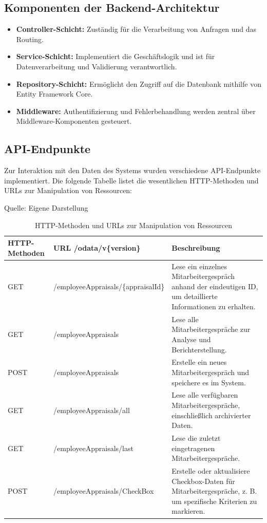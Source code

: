 \subsection{Komponenten der Backend-Architektur}
\begin{itemize}
    \item \textbf{Controller-Schicht:} Zuständig für die Verarbeitung von Anfragen und das Routing.
    \item \textbf{Service-Schicht:} Implementiert die Geschäftslogik und ist für Datenverarbeitung und Validierung verantwortlich.
    \item \textbf{Repository-Schicht:} Ermöglicht den Zugriff auf die Datenbank mithilfe von Entity Framework Core.
    \item \textbf{Middleware:} Authentifizierung und Fehlerbehandlung werden zentral über Middleware-Komponenten gesteuert.
\end{itemize}

\subsection{API-Endpunkte}
Zur Interaktion mit den Daten des Systems wurden verschiedene API-Endpunkte implementiert. Die folgende Tabelle listet die wesentlichen HTTP-Methoden und URLs zur Manipulation von Ressourcen:

\begin{table}[H]
\caption{HTTP-Methoden und URLs zur Manipulation von Ressourcen}
\label{table:http-methods}
\raggedright
{\scriptsize Quelle: Eigene Darstellung} \\[0.3em]
\renewcommand{\arraystretch}{1.1} %
\setlength{\tabcolsep}{1.8pt} %
\begin{tabularx}{\textwidth}{>{\centering\arraybackslash}m{2cm}|>{\centering\arraybackslash}m{5.5cm}|>{\raggedright\arraybackslash}m{6.5cm}}
\hline
\textbf{HTTP-Methoden} & \textbf{URL /odata/v\{version\}} & \textbf{Beschreibung} \\ \hline
GET & /employeeAppraisals/\{appraisalId\} & Lese ein einzelnes Mitarbeitergespräch anhand der eindeutigen ID, um detaillierte Informationen zu erhalten. \\ \hline
GET & /employeeAppraisals & Lese alle Mitarbeitergespräche zur Analyse und Berichterstellung. \\ \hline
POST & /employeeAppraisals & Erstelle ein neues Mitarbeitergespräch und speichere es im System. \\ \hline
GET & /employeeAppraisals/all & Lese alle verfügbaren Mitarbeitergespräche, einschließlich archivierter Daten. \\ \hline
GET & /employeeAppraisals/last & Lese die zuletzt eingetragenen Mitarbeitergespräche. \\ \hline
POST & /employeeAppraisals/CheckBox & Erstelle oder aktualisiere Checkbox-Daten für Mitarbeitergespräche, z. B. um spezifische Kriterien zu markieren. \\ \hline
\end{tabularx}
\end{table}



